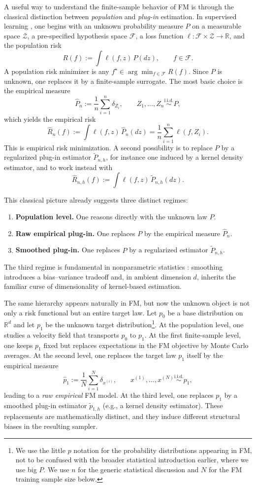 \documentclass[a4paper,11pt]{article}
\theoremstyle{plain}
\theoremstyle{definition}
\begin{document}
A useful way to understand the finite-sample behavior of FM is through the classical distinction between \emph{population} and \emph{plug-in} estimation. In supervised learning \cite{bach2024learning}, one begins with an unknown probability measure $P$ on a measurable space $\mathcal Z$, a pre-specified hypothesis space $\mathcal F$, a loss function $\ell:\mathcal F\times \mathcal Z\to \mathbb R$, and the population risk
\[
R(f):=\int \ell(f,z)\, P(dz), \qquad f\in\mathcal F.
\]
A population risk minimizer is any
\(
f^\star\in \arg\min_{f\in\mathcal F} R(f).
\)
Since $P$ is unknown, one replaces it by a finite-sample surrogate. The most basic choice is the empirical measure
\[
\hat P_n:=\frac1n\sum_{i=1}^n \delta_{Z_i},
\qquad Z_1,\dots,Z_n \overset{\mathrm{i.i.d.}}{\sim} P,
\]
which yields the empirical risk
\[
\hat R_n(f):=\int \ell(f,z)\,\hat P_n(dz)=\frac1n\sum_{i=1}^n \ell(f,Z_i).
\]
This is empirical risk minimization. A second possibility is to replace $P$ by a regularized plug-in estimator $\tilde P_{n,h}$, for instance one induced by a kernel density estimator, and to work instead with
\[
\hat R_{n,h}(f):=\int \ell(f,z)\,\tilde P_{n,h}(dz).
\]

This classical picture already suggests three distinct regimes:
\begin{enumerate}[label=(\roman*),leftmargin=2.5em]
    \item \textbf{Population level.} One reasons directly with the unknown law $P$.
    \item \textbf{Raw empirical plug-in.} One replaces $P$ by the empirical measure $\hat P_n$.
    \item \textbf{Smoothed plug-in.} One replaces $P$ by a regularized estimator $\tilde P_{n,h}$.
\end{enumerate}
The third regime is fundamental in nonparametric statistics \cite{gyorfi2002distribution, tsybakov2008nonparametric}: smoothing introduces a bias--variance tradeoff and, in ambient dimension $d$, inherits the familiar curse of dimensionality of kernel-based estimation.

The same hierarchy appears naturally in FM, but now the unknown object is not only a risk functional but an entire target law. Let $p_0$ be a base distribution on $\mathbb R^d$ and let $p_1$ be the unknown target distribution\footnote{We use the little $p$ notation for the probability distributions appearing in FM, not to be confused with the broader statistical introduction earlier, where we use big $P$. We use \(n\) for the generic statistical discussion and \(N\) for the FM training sample size below. }. At the population level, one studies a velocity field that transports $p_0$ to $p_1$. At the first finite-sample level, one keeps $p_1$ fixed but replaces expectations in the FM objective by Monte Carlo averages. At the second level, one replaces the target law $p_1$ itself by the empirical measure
\[
\hat p_1:=\frac1N \sum_{i=1}^N \delta_{x^{(i)}},
\qquad x^{(1)},\dots,x^{(N)} \overset{\mathrm{i.i.d.}}{\sim} p_1,
\]
leading to a \emph{raw empirical} FM model. At the third level, one replaces \(p_1\) by a smoothed plug-in estimator \(\tilde p_{1,h}\) (e.g., a kernel density estimator). These replacements are mathematically distinct, and they induce different structural biases in the resulting sampler.
\end{document}
